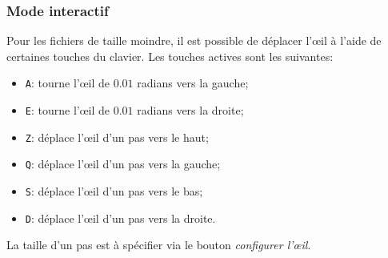 \subsubsection*{Mode interactif}
Pour les fichiers de taille moindre, il est possible de déplacer
l'\oe{}il à l'aide de certaines touches du clavier. Les
touches actives sont les suivantes:
\begin{itemize}
\item \texttt{A}: tourne l'\oe{}il de $0.01$ radians vers la gauche;
\item \texttt{E}: tourne l'\oe{}il de $0.01$ radians vers la droite;
\item \texttt{Z}: déplace l'\oe{}il d'un pas vers le haut;
\item \texttt{Q}: déplace l'\oe{}il d'un pas vers la gauche;
\item \texttt{S}: déplace l'\oe{}il d'un pas vers le bas;
\item \texttt{D}: déplace l'\oe{}il d'un pas vers la droite.
\end{itemize}
La taille d'un pas est à spécifier via le bouton \emph{configurer l'\oe{}il}.
